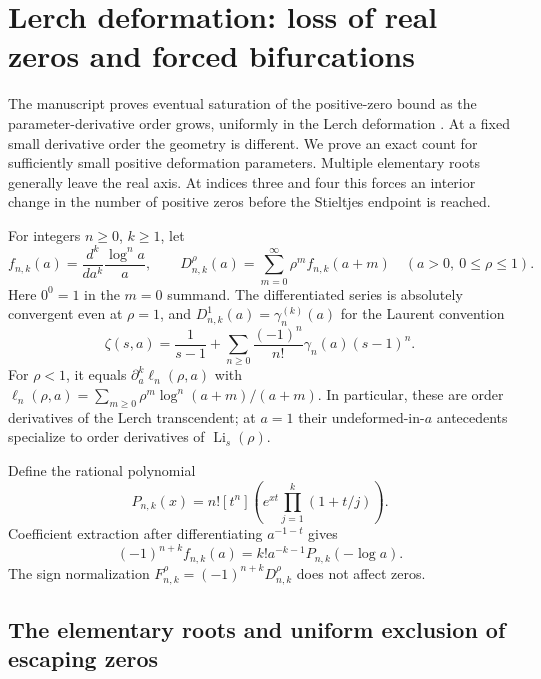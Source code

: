 \documentclass[11pt,letterpaper]{article}
\numberwithin{equation}{section}
\theoremstyle{plain}
\theoremstyle{definition}
\theoremstyle{remark}
\begin{document}
\section{Lerch deformation: loss of real zeros and forced bifurcations}
\label{cont26:sec:lerch-bifurcations}

The manuscript proves eventual saturation of the positive-zero bound as
the parameter-derivative order grows, uniformly in the Lerch deformation
\cite{ProveIt}. At a fixed small derivative order the geometry is different.
We prove an exact count for sufficiently small positive deformation
parameters. Multiple elementary roots generally leave the real axis.
At indices three and four this forces an interior change in the number
of positive zeros before the Stieltjes endpoint is reached.

For integers $n\geq0$, $k\geq1$, let
\begin{equation}\label{cont26:eq:bif-family}
 f_{n,k}(a)=\frac{d^k}{da^k}\frac{\log^n a}{a},\qquad
 D_{n,k}^{\rho}(a)=\sum_{m=0}^{\infty}\rho^m f_{n,k}(a+m)
 \quad (a>0,\ 0\leq\rho\leq1).
\end{equation}
Here $0^0=1$ in the $m=0$ summand. The differentiated series is absolutely
convergent even at $\rho=1$, and
$D_{n,k}^{1}(a)=\gamma_n^{(k)}(a)$ for the Laurent convention
\[
 \zeta(s,a)=\frac1{s-1}
       +\sum_{n\geq0}\frac{(-1)^n}{n!}\gamma_n(a)(s-1)^n.
\]
For $\rho<1$, it equals $\partial_a^k\ell_n(\rho,a)$ with
$\ell_n(\rho,a)=\sum_{m\geq0}\rho^m\log^n(a+m)/(a+m)$.
In particular, these are order derivatives of the Lerch transcendent;
at $a=1$ their undeformed-in-$a$ antecedents specialize to order
derivatives of $\operatorname{Li}_s(\rho)$.

Define the rational polynomial
\begin{equation}\label{cont26:eq:bif-polynomial}
 P_{n,k}(x)=n![t^n]\left(e^{xt}\prod_{j=1}^k(1+t/j)\right).
\end{equation}
Coefficient extraction after differentiating $a^{-1-t}$ gives
\begin{equation}\label{cont26:eq:bif-elementary}
 (-1)^{n+k} f_{n,k}(a)=k!a^{-k-1}P_{n,k}(-\log a).
\end{equation}
The sign normalization
$F_{n,k}^{\rho}=(-1)^{n+k}D_{n,k}^{\rho}$ does not affect zeros.

\subsection{The elementary roots and uniform exclusion of escaping zeros}
\end{document}
